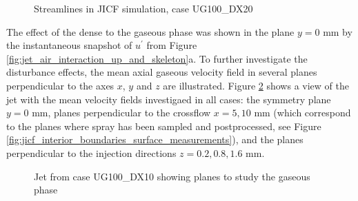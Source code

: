 \begin{figure}[h!]
	\centering
	\vspace*{-0.5in}
	\caption{Streamlines in JICF simulation, case UG100\_DX20}
		\label{fig:streamlines_UG100_DX20_from_dump}
\end{figure}


The effect of the dense to the gaseous phase was shown in the plane $y = 0$ mm by the instantaneous snapshot of $u^{\prime}$ from Figure \ref{fig:jet_air_interaction_up_and_skeleton}a. To further investigate the disturbance effects, the mean axial gaseous velocity field in several planes perpendicular to the axes $x$, $y$ and $z$ are illustrated. Figure \ref{fig:jicf_sps_with_gaseous_planes} shows a view of the jet with the mean velocity fields investigaed in all cases: the symmetry plane $y = 0$ mm, planes perpendicular to the crossflow $x = 5, 10$ mm (which correspond to the planes where spray has been sampled and postprocessed, see Figure \ref{fig:jicf_interior_boundaries_surface_measurements}), and the planes perpendicular to the injection directions $z = 0.2, 0.8, 1.6$ mm. 


\begin{figure}[h!]
	\centering
	\caption{Jet from case UG100\_DX10 showing planes to study the gaseous phase}
	\label{fig:jicf_sps_with_gaseous_planes}
\end{figure}



